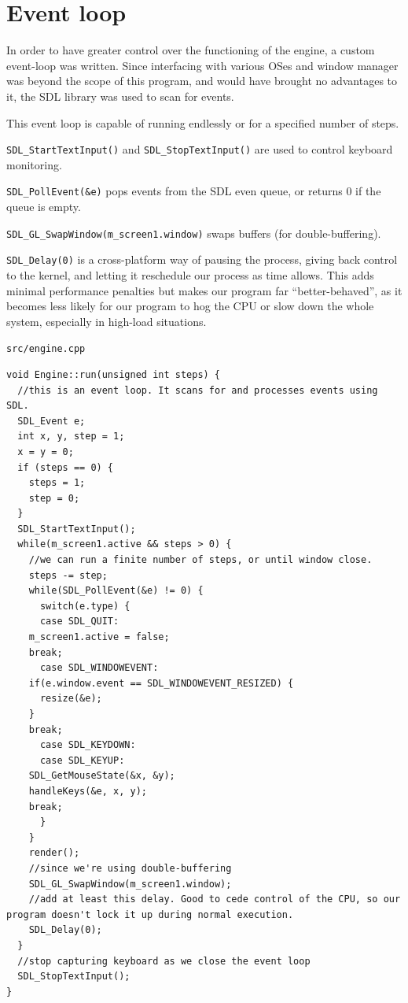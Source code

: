 \documentclass{scrartcl}
\begin{document}
\section{Event loop}
In order to have greater control over the functioning of the engine, a custom event-loop was written. Since interfacing with various OSes and window manager was beyond the scope of this program, and would have brought no advantages to it, the SDL library was used to scan for events.

This event loop is capable of running endlessly or for a specified number of steps.

\lstinline{SDL_StartTextInput()} and \lstinline{SDL_StopTextInput()} are used to control keyboard monitoring.

\lstinline{SDL_PollEvent(&e)} pops events from the SDL even queue, or returns $0$ if the queue is empty.

\lstinline{SDL_GL_SwapWindow(m_screen1.window)} swaps buffers (for double-buffering).

\lstinline{SDL_Delay(0)} is a cross-platform way of pausing the process, giving back control to the kernel, and letting it reschedule our process as time allows. This adds minimal performance penalties but makes our program far ``better-behaved'', as it becomes less likely for our program to hog the CPU or slow down the whole system, especially in high-load situations.

\lstinline{src/engine.cpp}
\begin{lstlisting}
void Engine::run(unsigned int steps) {
  //this is an event loop. It scans for and processes events using SDL.
  SDL_Event e;
  int x, y, step = 1;
  x = y = 0;
  if (steps == 0) {
    steps = 1;
    step = 0;
  }
  SDL_StartTextInput();
  while(m_screen1.active && steps > 0) {
    //we can run a finite number of steps, or until window close.
    steps -= step;
    while(SDL_PollEvent(&e) != 0) {
      switch(e.type) {
      case SDL_QUIT:
	m_screen1.active = false;
	break;
      case SDL_WINDOWEVENT:
	if(e.window.event == SDL_WINDOWEVENT_RESIZED) {
	  resize(&e);
	}
	break;
      case SDL_KEYDOWN:
      case SDL_KEYUP:
	SDL_GetMouseState(&x, &y);
	handleKeys(&e, x, y);
	break;
      }
    }
    render();
    //since we're using double-buffering
    SDL_GL_SwapWindow(m_screen1.window);
    //add at least this delay. Good to cede control of the CPU, so our program doesn't lock it up during normal execution.
    SDL_Delay(0);
  }
  //stop capturing keyboard as we close the event loop
  SDL_StopTextInput();
}
\end{lstlisting}
\end{document}

